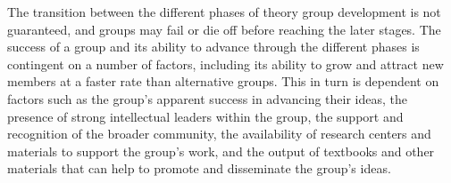 The transition between the different phases of theory group development is not guaranteed, and groups may fail or die off before reaching the later stages. The success of a group and its ability to advance through the different phases is contingent on a number of factors, including its ability to grow and attract new members at a faster rate than alternative groups. This in turn is dependent on factors such as the group's apparent success in advancing their ideas, the presence of strong intellectual leaders within the group, the support and recognition of the broader community, the availability of research centers and materials to support the group's work, and the output of textbooks and other materials that can help to promote and disseminate the group's ideas.



